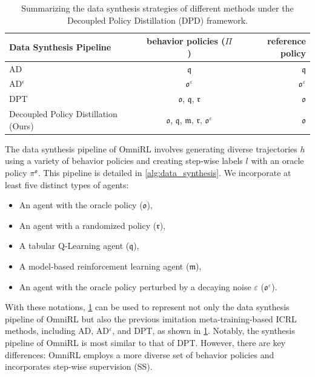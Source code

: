 \documentclass{article}
\renewcommand{\cite}[1]{\citep{#1}}
\begin{document}
\begin{table}[t]
\caption{Summarizing the data synthesis strategies of different methods under the Decoupled Policy Distillation (DPD) framework.}
\label{table:icrl_data_synthesis}
\vskip 0.15in
\begin{center}
\begin{small}
\begin{sc}
\begin{tabular}{lcr}
\toprule
Data Synthesis Pipeline & behavior policies ($\Pi$) & reference policy \\
\midrule
AD \cite{laskin2022context}    &  $\mathfrak{q}$ & $\mathfrak{q}$ \\
AD$^{\epsilon}$ \cite{zisman2023emergence}    & $\mathfrak{o}^{\varepsilon}$ & $\mathfrak{o}^{\varepsilon}$ \\
DPT \cite{lee2024supervised} & $\mathfrak{o}$, $\mathfrak{q}$, $\mathfrak{r}$ & $\mathfrak{o}$ \\
Decoupled Policy Distillation (Ours) & $\mathfrak{o}$, $\mathfrak{q}$, $\mathfrak{m}$, $\mathfrak{r}$, $\mathfrak{o}^{\varepsilon}$ & $\mathfrak{o}$ \\
\bottomrule
\end{tabular}
\end{sc}
\end{small}
\end{center}
\vskip -0.1in
\end{table}

The data synthesis pipeline of OmniRL involves generating diverse trajectories $h$ using a variety of behavior policies and creating step-wise labels $l$ with an oracle policy $ \pi^{\mathfrak{o}} $. This pipeline is detailed in \cref{alg:data_synthesis}. We incorporate at least five distinct types of agents:
\begin{itemize}
\item An agent with the oracle policy ($\mathfrak{o}$),
\item An agent with a randomized policy ($\mathfrak{r}$),
\item A tabular Q-Learning agent ($\mathfrak{q}$),
\item A model-based reinforcement learning agent ($\mathfrak{m}$),
\item An agent with the oracle policy perturbed by a decaying noise $\varepsilon$ ($\mathfrak{o}^\varepsilon$).
\end{itemize}

With these notations, \cref{table:icrl_data_synthesis} can be used to represent not only the data synthesis pipeline of OmniRL but also the previous imitation meta-training-based ICRL methods, including AD, AD$^\varepsilon$, and DPT, as shown in \cref{table:icrl_data_synthesis}. Notably, the synthesis pipeline of OmniRL is most similar to that of DPT. However, there are key differences: OmniRL employs a more diverse set of behavior policies and incorporates step-wise supervision (SS).
\end{document}
